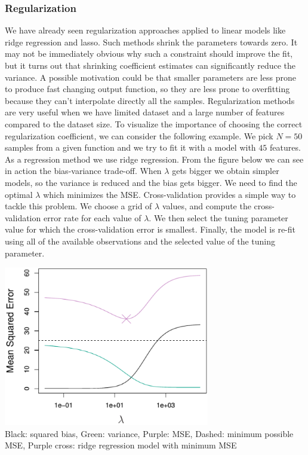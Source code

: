 \documentclass[../main.tex]{subfiles}
\begin{document}
\newpage
\subsubsection{Regularization}
We have already seen regularization approaches applied to linear models like ridge regression and lasso. Such methods shrink the parameters towards zero. It may not be immediately obvious why such a constraint should improve the fit, but it turns out that shrinking coefficient estimates can significantly reduce the variance. A possible motivation could be that smaller parameters are less prone to produce fast changing output function, so they are less prone to overfitting because they can't interpolate directly all the samples. Regularization methods are very useful when we have limited dataset and a large number of features compared to the dataset size. To visualize the importance of choosing the correct regularization coefficient, we can consider the following example. We pick $N = 50$ samples from a given function and we try to fit it with a model with $45$ features. As a regression method we use ridge regression.
From the figure below we can see in action the bias-variance trade-off. When $\lambda$ gets bigger we obtain simpler models, so the variance is reduced and the bias gets bigger. We need to find the optimal $\lambda$ which minimizes the MSE. Cross-validation provides a simple way to tackle this problem. We choose a grid of $\lambda$ values, and compute the cross-validation error rate for each value of $\lambda$. We then select the tuning parameter value for which the cross-validation error is smallest. Finally, the model is re-fit using all of the available observations and the selected value of the tuning parameter.

\begin{center}
    \includegraphics[width=90mm]{images/Lasso_MSE_Lambda.PNG} \\
    Black: squared bias, Green: variance, Purple: MSE, Dashed: minimum possible MSE, Purple cross: ridge regression model with minimum MSE
\end{center}
\end{document}
